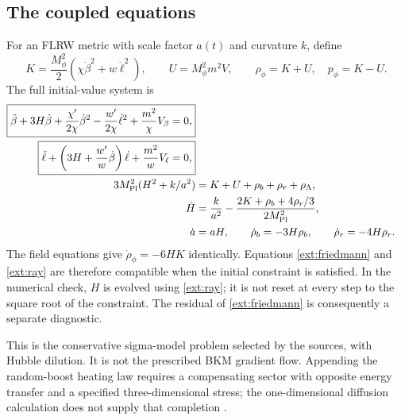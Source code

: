 \documentclass[11pt]{article}
\newcommand{\mpl}{M_{\rm Pl}}
\newcommand{\mf}{M_\phi}
\begin{document}
\subsection{The coupled equations}
For an FLRW metric with scale factor $a(t)$ and curvature $k$, define
\begin{equation}
 K=\frac{\mf^2}{2}(\chi\dot\beta^2+w\dot\ell^2),\qquad
 U=\mf^2m^2 V,\qquad \rho_\phi=K+U,\quad p_\phi=K-U.
\end{equation}
The full initial-value system is
\begin{align}
 \boxed{\ddot\beta+3H\dot\beta+\frac{\chi'}{2\chi}\dot\beta^2
       -\frac{w'}{2\chi}\dot\ell^2+\frac{m^2}{\chi}V_\beta=0,}
 \label{ext:beta}\\
 \boxed{\ddot\ell+\left(3H+\frac{w'}{w}\dot\beta\right)\dot\ell
                   +\frac{m^2}{w}V_\ell=0,}\label{ext:ell}\\
 3\mpl^2(H^2+k/a^2)&=K+U+\rho_b+\rho_r+\rho_\Lambda,\label{ext:friedmann}\\
 \dot H&=\frac{k}{a^2}-\frac{2K+\rho_b+4\rho_r/3}{2\mpl^2},\label{ext:ray}\\
 \dot a&=aH,\qquad \dot\rho_b=-3H\rho_b,\qquad \dot\rho_r=-4H\rho_r.
\end{align}
The field equations give $\dot\rho_\phi=-6HK$ identically. Equations \eqref{ext:friedmann} and \eqref{ext:ray} are therefore compatible when the initial constraint is satisfied. In the numerical check, $H$ is evolved using \eqref{ext:ray}; it is not reset at every step to the square root of the constraint. The residual of \eqref{ext:friedmann} is consequently a separate diagnostic.

This is the conservative sigma-model problem selected by the sources, with Hubble dilution. It is not the prescribed BKM gradient flow. Appending the random-boost heating law requires a compensating sector with opposite energy transfer and a specified three-dimensional stress; the one-dimensional diffusion calculation does not supply that completion \cite[Section 30.3]{consolidated}.
\end{document}
